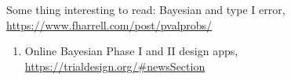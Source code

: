 \documentclass[
]{article}
\providecommand{\tightlist}{%
  \setlength{\itemsep}{0pt}\setlength{\parskip}{0pt}}
\begin{document}
Some thing interesting to read: Bayesian and type I error,
\url{https://www.fharrell.com/post/pvalprobs/}

\begin{enumerate}
\def\labelenumi{\arabic{enumi}.}
\setcounter{enumi}{4}
\tightlist
\item
  Online Bayesian Phase I and II design apps,
  \url{https://trialdesign.org/\#newsSection}
\end{enumerate}
\end{document}
